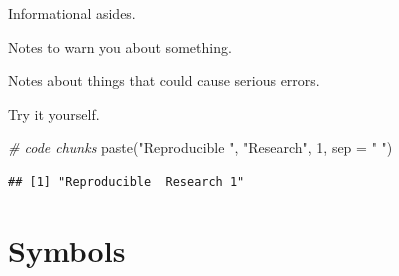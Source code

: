 \documentclass[
  oneside]{book}
\newenvironment{Shaded}{\begin{snugshade}}{\end{snugshade}}
\newcommand{\AttributeTok}[1]{\textcolor[rgb]{0.77,0.63,0.00}{#1}}
\newcommand{\CommentTok}[1]{\textcolor[rgb]{0.56,0.35,0.01}{\textit{#1}}}
\newcommand{\DecValTok}[1]{\textcolor[rgb]{0.00,0.00,0.81}{#1}}
\newcommand{\FunctionTok}[1]{\textcolor[rgb]{0.00,0.00,0.00}{#1}}
\newcommand{\NormalTok}[1]{#1}
\newcommand{\StringTok}[1]{\textcolor[rgb]{0.31,0.60,0.02}{#1}}
\begin{document}
\begin{info}
Informational asides.

\end{info}

\begin{warning}
Notes to warn you about something.

\end{warning}

\begin{dangerous}
Notes about things that could cause serious errors.

\end{dangerous}

\begin{try}
Try it yourself.

\end{try}

\begin{Shaded}
\begin{Highlighting}[]
\CommentTok{\# code chunks}
\FunctionTok{paste}\NormalTok{(}\StringTok{"Reproducible "}\NormalTok{, }\StringTok{"Research"}\NormalTok{, }\DecValTok{1}\NormalTok{, }\AttributeTok{sep =} \StringTok{" "}\NormalTok{)}
\end{Highlighting}
\end{Shaded}

\begin{verbatim}
## [1] "Reproducible  Research 1"
\end{verbatim}

\hypertarget{symbols}{%
\chapter{Symbols}\label{symbols}}
\end{document}
